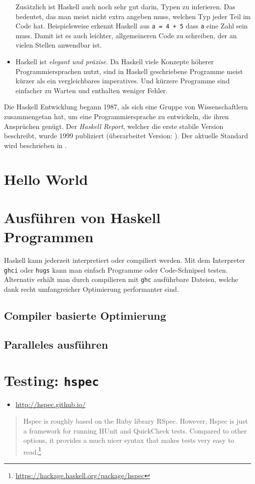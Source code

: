 \begin{itemize}
Zusätzlich ist Haskell auch noch sehr gut darin, Typen zu inferieren. Das
bedeutet, das man meist nicht extra angeben muss, welchen Typ jeder Teil im
Code hat. Beispielsweise erkennt Haskell aus \texttt{a = 4 + 5} dass
\texttt{a} eine Zahl sein muss.
Damit ist es auch leichter, allgemeineren Code zu schreiben, der an vielen
Stellen anwendbar ist.

  \item 
Haskell ist \emph{elegant und präzise}.
Da Haskell viele Konzepte höherer Programmiersprachen nutzt, sind in Haskell
geschriebene Programme meist kürzer als ein vergleichbares imperatives. Und
kürzere Programme sind einfacher zu Warten und enthalten weniger Fehler.
\end{itemize}

Die Haskell Entwicklung begann 1987, als sich eine Gruppe von Wissenschaftlern
zusammengetan hat, um eine Programmiersprache zu entwickeln, die ihren
Ansprüchen genügt. Der \emph{Haskell Report}, welcher die erste stabile Version
beschreibt, wurde 1999 publiziert (überarbeitet Version: \cite{haskell98}).
Der aktuelle Standard wird beschrieben in \cite{haskell2010}.

\section{Hello World}

\section{Ausführen von Haskell Programmen}

Haskell kann jederzeit interpretiert oder compiliert werden. Mit dem
Interpreter \texttt{ghci} oder \texttt{hugs} kann man einfach Programme oder
Code-Schnipsel testen.
Alternativ erhält man durch compilieren mit \texttt{ghc} ausführbare Dateien,
welche dank recht umfangreicher Optimierung performanter sind.

\subsection{Compiler basierte Optimierung}

\subsection{Paralleles ausführen}

\section{Testing: \texttt{hspec}}
\begin{itemize}
  \item \url{http://hspec.github.io/}
\end{itemize}   
\begin{quote}
  Hspec is roughly based on the Ruby library RSpec. However, Hspec is just a
  framework for running HUnit and QuickCheck tests. Compared to other options,
  it provides a much nicer syntax that makes tests very easy to
  read.\footnote{\url{https://hackage.haskell.org/package/hspec}}
\end{quote}

